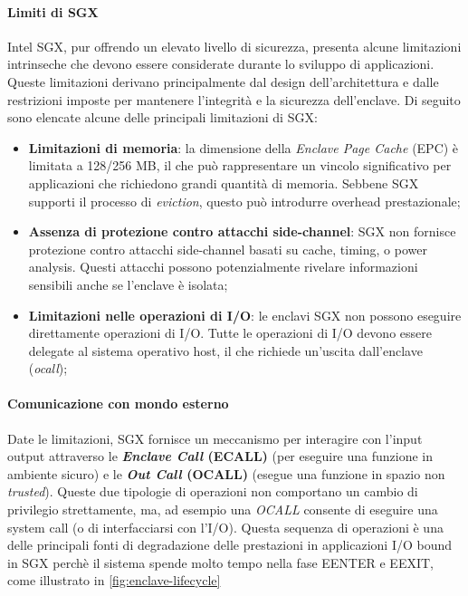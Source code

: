 \documentclass{article}
\begin{document}
\paragraph{Limiti di SGX}\label{sec:sgx-limitations}
Intel SGX, pur offrendo un elevato livello di sicurezza, presenta alcune limitazioni intrinseche che devono essere considerate durante lo sviluppo di applicazioni. Queste limitazioni derivano principalmente dal design dell'architettura e dalle restrizioni imposte per mantenere l'integrità e la sicurezza dell'enclave. Di seguito sono elencate alcune delle principali limitazioni di SGX:

\begin{itemize}
  \item \textbf{Limitazioni di memoria}: la dimensione della \textit{Enclave Page Cache} (EPC) è limitata a 128/256 MB, il che può rappresentare un vincolo significativo per applicazioni che richiedono grandi quantità di memoria. Sebbene SGX supporti il processo di \textit{eviction}, questo può introdurre overhead prestazionale;
  \item \textbf{Assenza di protezione contro attacchi side-channel}: SGX non fornisce protezione contro attacchi side-channel basati su cache, timing, o power analysis. Questi attacchi possono potenzialmente rivelare informazioni sensibili anche se l'enclave è isolata;
  \item \textbf{Limitazioni nelle operazioni di I/O}: le enclavi SGX non possono eseguire direttamente operazioni di I/O. Tutte le operazioni di I/O devono essere delegate al sistema operativo host, il che richiede un'uscita dall'enclave (\textit{ocall});
\end{itemize}

\paragraph{Comunicazione con mondo esterno} Date le limitazioni, SGX fornisce un meccanismo per interagire con l'input output attraverso le \textbf{\textit{Enclave Call} (ECALL)} (per eseguire una funzione in ambiente sicuro) e le \textbf{\textit{Out Call} (OCALL)} (esegue una funzione in spazio non \textit{trusted}). Queste due tipologie di operazioni non comportano un cambio di privilegio strettamente, ma, ad esempio una \textit{OCALL} consente di eseguire una system call (o di interfacciarsi con l'I/O). Questa sequenza di operazioni è una delle principali fonti di degradazione delle prestazioni in applicazioni I/O bound in SGX perchè il sistema spende molto tempo nella fase EENTER  e EEXIT, come illustrato in \cref{fig:enclave-lifecycle}
\end{document}

